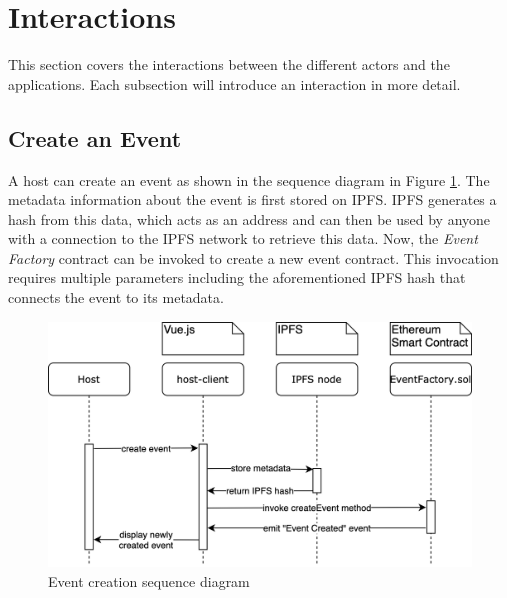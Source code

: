 \section{Interactions}
This section covers the interactions between the different actors and the applications. Each subsection will introduce an interaction in more detail.

\subsection{Create an Event}\label{interaction:create-event}
A host can create an event as shown in the sequence diagram in Figure \ref{fig:create-event-sequence-diagram}. The metadata information about the event is first stored on IPFS. IPFS generates a hash from this data, which acts as an address and can then be used by anyone with a connection to the IPFS network to retrieve this data. Now, the \textit{Event Factory} contract can be invoked to create a new event contract. This invocation requires multiple parameters including the aforementioned IPFS hash that connects the event to its metadata.
\begin{figure}[H]
    \centering
    \includegraphics[width=16cm]{design/diagrams/create-event-seq.png}
    \caption{Event creation sequence diagram}
    \label{fig:create-event-sequence-diagram}
\end{figure}

